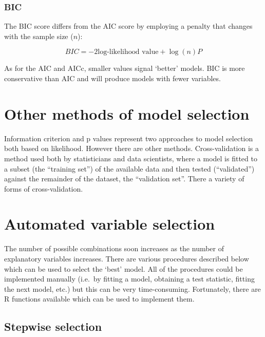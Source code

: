 \documentclass[
  oneside]{krantz}
\begin{document}
\hypertarget{bic}{%
\subsubsection{BIC}\label{bic}}

The BIC score differs from the AIC score by employing a penalty that changes with the sample size (\(n\)):

\begin{equation}
BIC=-2 \textrm{log-likelihood value}  + \log(n)P
\end{equation}

As for the AIC and AICc, smaller values signal `better' models. BIC is more conservative than AIC and will produce models with fewer variables.

\hypertarget{other-methods-of-model-selection}{%
\section{Other methods of model selection}\label{other-methods-of-model-selection}}

Information criterion and p values represent two approaches to model selection both based on likelihood. However there are other methods. Cross-validation is a method used both by statisticians and data scientists, where a model is fitted to a subset (the ``training set'') of the available data and then tested (``validated'') against the remainder of the dataset, the ``validation set''. There a variety of forms of cross-validation.

\hypertarget{automated-variable-selection}{%
\section{Automated variable selection}\label{automated-variable-selection}}

The number of possible combinations soon increases as the number of explanatory variables increases. There are various procedures described below which can be used to select the `best' model. All of the procedures could be implemented manually (i.e.~by fitting a model, obtaining a test statistic, fitting the next model, etc.) but this can be very time-consuming. Fortunately, there are R functions available which can be used to implement them.

\hypertarget{stepwise-selection}{%
\subsection{Stepwise selection}\label{stepwise-selection}}
\end{document}

